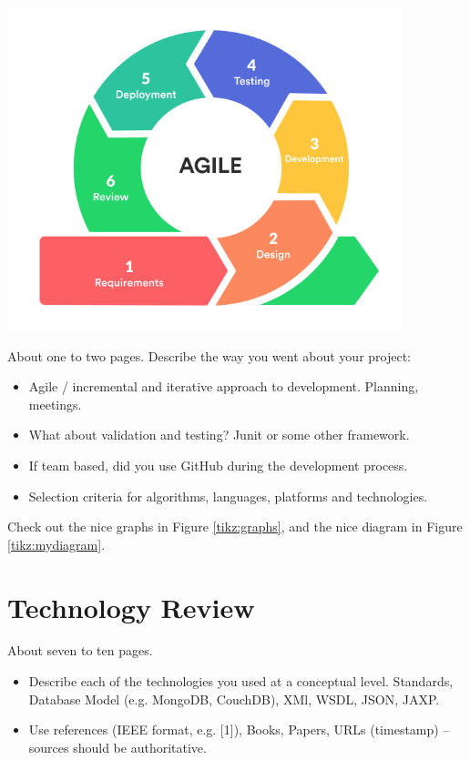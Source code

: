 \begin{center}    
      \includegraphics[scale=0.9]{img/Agile.png}
\end{center}



\vspace{70mm} %

About one to two pages.
Describe the way you went about your project:
\begin{itemize}
\item Agile / incremental and iterative approach to development. Planning, meetings.
\item What about validation and testing? Junit or some other framework.
\item If team based, did you use GitHub during the development process.
\item Selection criteria for algorithms, languages, platforms and technologies.
\end{itemize}
Check out the nice graphs in Figure \ref{tikz:graphs}, and the nice diagram in Figure \ref{tikz:mydiagram}.



\chapter{Technology Review}
About seven to ten pages.
\begin{itemize}
\item Describe each of the technologies you used at a conceptual level. Standards, Database Model (e.g. MongoDB, CouchDB), XMl, WSDL, JSON, JAXP.
\item Use references (IEEE format, e.g. [1]), Books, Papers, URLs (timestamp) – sources should be authoritative. 
\end{itemize}

